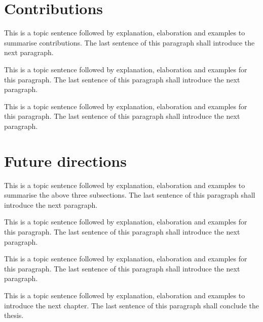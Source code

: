\section{Contributions}
\label{sec:ch_8_fourthmain}

This is a topic sentence followed by explanation, elaboration and examples to summarise contributions. The last sentence of this paragraph shall introduce the next paragraph. \lipsum[1]

This is a topic sentence followed by explanation, elaboration and examples for this paragraph. The last sentence of this paragraph shall introduce the next paragraph. \lipsum[1]

This is a topic sentence followed by explanation, elaboration and examples for this paragraph. The last sentence of this paragraph shall introduce the next paragraph. \lipsum[1]

\section{Future directions}
\label{sec:ch_8_forward}

This is a topic sentence followed by explanation, elaboration and examples to summarise the above three subsections. The last sentence of this paragraph shall introduce the next paragraph. \lipsum[1]

This is a topic sentence followed by explanation, elaboration and examples for this paragraph. The last sentence of this paragraph shall introduce the next paragraph. \lipsum[1]

This is a topic sentence followed by explanation, elaboration and examples for this paragraph. The last sentence of this paragraph shall introduce the next paragraph. \lipsum[1]

This is a topic sentence followed by explanation, elaboration and examples to introduce the next chapter. The last sentence of this paragraph shall conclude the thesis. \lipsum[1]








